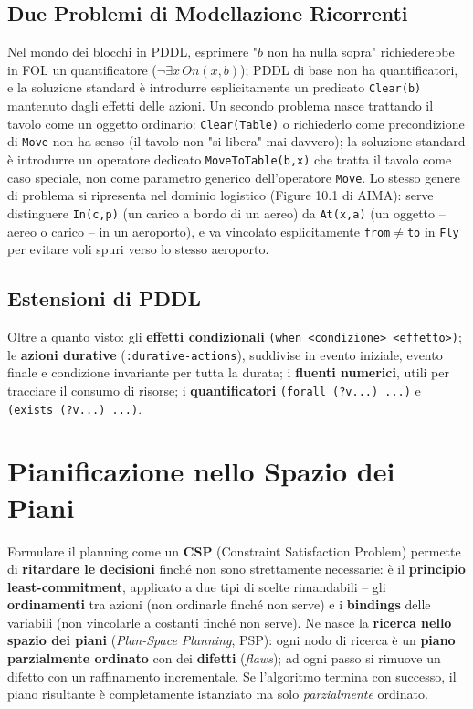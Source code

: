 \documentclass[a4paper,11pt]{article}
\begin{document}
\subsection{Due Problemi di Modellazione Ricorrenti}

Nel mondo dei blocchi in PDDL, esprimere "$b$ non ha nulla sopra" richiederebbe in FOL un quantificatore ($\neg\exists x\,On(x,b)$); PDDL di base non ha quantificatori, e la soluzione standard è introdurre esplicitamente un predicato \texttt{Clear(b)} mantenuto dagli effetti delle azioni. Un secondo problema nasce trattando il tavolo come un oggetto ordinario: \texttt{Clear(Table)} o richiederlo come precondizione di \texttt{Move} non ha senso (il tavolo non "si libera" mai davvero); la soluzione standard è introdurre un operatore dedicato \texttt{MoveToTable(b,x)} che tratta il tavolo come caso speciale, non come parametro generico dell'operatore \texttt{Move}. Lo stesso genere di problema si ripresenta nel dominio logistico (Figure 10.1 di AIMA): serve distinguere \texttt{In(c,p)} (un carico a bordo di un aereo) da \texttt{At(x,a)} (un oggetto -- aereo o carico -- in un aeroporto), e va vincolato esplicitamente \texttt{from}$\neq$\texttt{to} in \texttt{Fly} per evitare voli spuri verso lo stesso aeroporto.

\subsection{Estensioni di PDDL}

Oltre a quanto visto: gli \textbf{effetti condizionali} \texttt{(when <condizione> <effetto>)}; le \textbf{azioni durative} (\texttt{:durative-actions}), suddivise in evento iniziale, evento finale e condizione invariante per tutta la durata; i \textbf{fluenti numerici}, utili per tracciare il consumo di risorse; i \textbf{quantificatori} \texttt{(forall (?v...) ...)} e \texttt{(exists (?v...) ...)}.

\newpage
\section{Pianificazione nello Spazio dei Piani}

Formulare il planning come un \textbf{CSP} (Constraint Satisfaction Problem) permette di \textbf{ritardare le decisioni} finché non sono strettamente necessarie: è il \textbf{principio least-commitment}, applicato a due tipi di scelte rimandabili -- gli \textbf{ordinamenti} tra azioni (non ordinarle finché non serve) e i \textbf{bindings} delle variabili (non vincolarle a costanti finché non serve). Ne nasce la \textbf{ricerca nello spazio dei piani} (\emph{Plan-Space Planning}, PSP): ogni nodo di ricerca è un \textbf{piano parzialmente ordinato} con dei \textbf{difetti} (\emph{flaws}); ad ogni passo si rimuove un difetto con un raffinamento incrementale. Se l'algoritmo termina con successo, il piano risultante è completamente istanziato ma solo \emph{parzialmente} ordinato.
\end{document}
